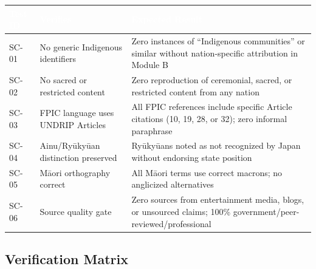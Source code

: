 \documentclass[11pt,letterpaper]{article}
\newcommand{\tableheader}[1]{\textbf{\sffamily\textcolor{white}{#1}}}
\begin{document}
\begin{center}
\begin{tabularx}{\textwidth}{C{1.2cm}L{3.5cm}X}
\toprule
{}
\tableheader{Test ID} & \tableheader{Verifies} & \tableheader{Expected Result} \\
\midrule
SC-01 & No generic Indigenous identifiers & Zero instances of ``Indigenous communities'' or similar without nation-specific attribution in Module B \\
SC-02 & No sacred or restricted content & Zero reproduction of ceremonial, sacred, or restricted content from any nation \\
SC-03 & FPIC language uses UNDRIP Articles & All FPIC references include specific Article citations (10, 19, 28, or 32); zero informal paraphrase \\
SC-04 & Ainu/Ryūkyūan distinction preserved & Ryūkyūans noted as not recognized by Japan without endorsing state position \\
SC-05 & Māori orthography correct & All Māori terms use correct macrons; no anglicized alternatives \\
SC-06 & Source quality gate & Zero sources from entertainment media, blogs, or unsourced claims; 100\% government/peer-reviewed/professional \\
\bottomrule
\end{tabularx}
\end{center}

\subsection{Verification Matrix}
\end{document}
